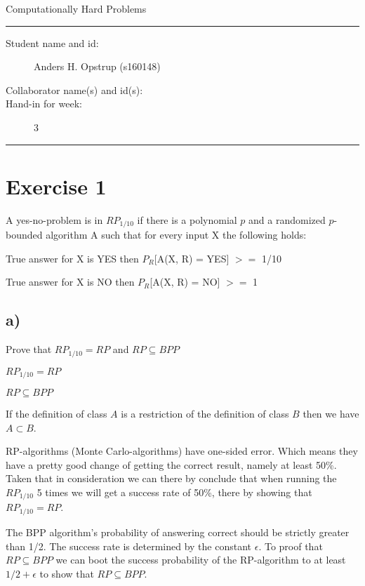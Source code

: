 \documentclass[11pt]{article}
\begin{document}
\begin{center}
{{\Large \sc Computationally Hard Problems}}
\end{center}
\rule{\textwidth}{1pt}
\begin{description}
\item[Student name and id:] Anders H. Opstrup (s160148)
\item[Collaborator name(s) and id(s):]
\item[Hand-in for week:] 3
\end{description}
\rule{\textwidth}{1pt}

\section*{Exercise 1}
A yes-no-problem is in $RP_{1/10}$ if there is a polynomial $p$ and a randomized $p$-bounded algorithm A such that for every input X the following holds: \newline

True answer for X is YES then $P_{R}$[A(X, R) = YES] $>=$ 1/10

True answer for X is NO then  $P_{R}$[A(X, R) = NO] $>=$ 1

\subsection*{a)}
Prove that $RP_{1/10} = RP$ and $RP\subseteq BPP$

$RP_{1/10} = RP$

$RP\subseteq BPP$ \newline

If the definition of class $A$ is a restriction of the definition of class $B$ then we have $A \subset B$. \newline

RP-algorithms (Monte Carlo-algorithms) have one-sided error. Which means they have a pretty good change of getting the correct result, namely at least 50\%. 
Taken that in consideration we can there by conclude that when running the $RP_{1/10}$ 5 times we will get a success rate of 50\%, there by showing that $RP_{1/10} = RP$. \newline

The BPP algorithm's probability of answering correct should be strictly greater than 1/2. The success rate is determined by the constant $\epsilon$. To proof that $RP\subseteq BPP$ we can boot the success probability of the RP-algorithm to at least $1/2 + \epsilon$ to show that $RP\subseteq BPP$.
\end{document}
